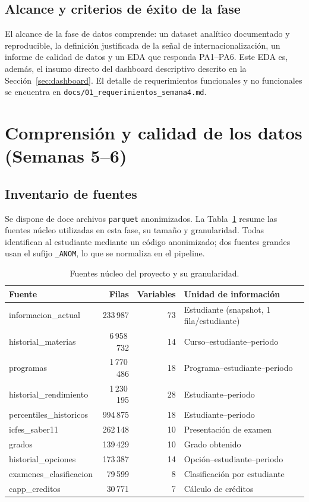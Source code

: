 \documentclass[12pt,a4paper]{article}
\begin{document}
\subsection{Alcance y criterios de éxito de la fase}
El alcance de la fase de datos comprende: un dataset analítico documentado y
reproducible, la definición justificada de la señal de internacionalización, un
informe de calidad de datos y un EDA que responda PA1--PA6. Este EDA es, además, el
insumo directo del dashboard descriptivo descrito en la
Sección~\ref{sec:dashboard}. El detalle de requerimientos funcionales y no
funcionales se encuentra en \texttt{docs/01\_requerimientos\_semana4.md}.

\section{Comprensión y calidad de los datos (Semanas 5--6)}
\subsection{Inventario de fuentes}
Se dispone de doce archivos \texttt{parquet} anonimizados. La
Tabla~\ref{tab:fuentes} resume las fuentes núcleo utilizadas en esta fase, su
tamaño y granularidad. Todas identifican al estudiante mediante un código
anonimizado; dos fuentes grandes usan el sufijo \texttt{\_ANOM}, lo que se
normaliza en el pipeline.

\begin{table}[H]
\centering
\caption{Fuentes núcleo del proyecto y su granularidad.}
\label{tab:fuentes}
\small
\begin{tabular}{>{\raggedright\arraybackslash}p{4.6cm} r r >{\raggedright\arraybackslash}p{4.6cm}}
\toprule
\textbf{Fuente} & \textbf{Filas} & \textbf{Variables} & \textbf{Unidad de información} \\
\midrule
informacion\_actual        & 233\,987   & 73 & Estudiante (snapshot, 1 fila/estudiante) \\
historial\_materias        & 6\,958\,732 & 14 & Curso--estudiante--periodo \\
programas                  & 1\,770\,486 & 18 & Programa--estudiante--periodo \\
historial\_rendimiento     & 1\,230\,195 & 28 & Estudiante--periodo \\
percentiles\_historicos    & 994\,875   & 18 & Estudiante--periodo \\
icfes\_saber11             & 262\,148   & 10 & Presentación de examen \\
grados                     & 139\,429   & 10 & Grado obtenido \\
historial\_opciones        & 173\,387   & 14 & Opción--estudiante--periodo \\
examenes\_clasificacion    & 79\,599    & 8  & Clasificación por estudiante \\
capp\_creditos             & 30\,771    & 7  & Cálculo de créditos \\
\bottomrule
\end{tabular}
\end{table}
\end{document}
